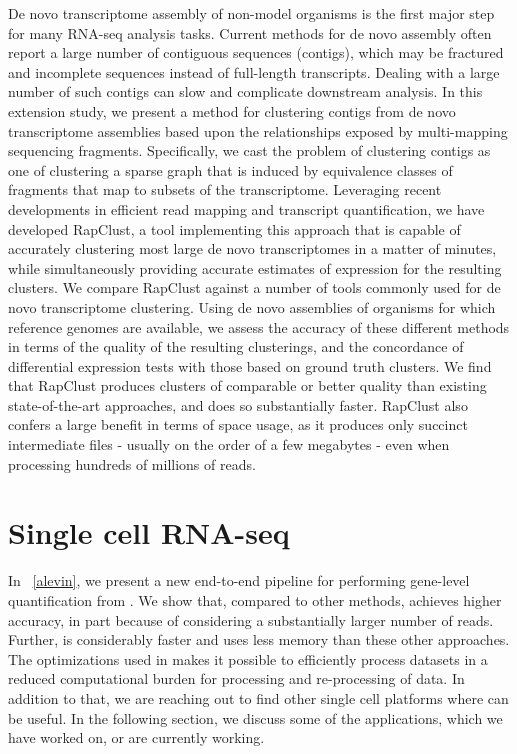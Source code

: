 De novo transcriptome assembly of non-model organisms is the first major step for many 
RNA-seq analysis tasks. Current methods for de novo assembly often report a large number 
of contiguous sequences (contigs), which may be fractured and incomplete sequences 
instead of full-length transcripts. Dealing with a large number of such contigs can 
slow and complicate downstream analysis. In this extension study, we present a method 
for clustering contigs from de novo transcriptome assemblies based upon the relationships 
exposed by multi-mapping sequencing fragments. Specifically, we cast the problem of 
clustering contigs as one of clustering a sparse graph that is induced by equivalence 
classes of fragments that map to subsets of the transcriptome. Leveraging recent developments 
in efficient read mapping and transcript quantification, we have developed RapClust, a tool 
implementing this approach that is capable of accurately clustering most large de novo 
transcriptomes in a matter of minutes, while simultaneously providing accurate estimates of 
expression for the resulting clusters. We compare RapClust against a number of tools commonly 
used for de novo transcriptome clustering. Using de novo assemblies of organisms for which 
reference genomes are available, we assess the accuracy of these different methods in terms of 
the quality of the resulting clusterings, and the concordance of differential expression tests 
with those based on ground truth clusters. We find that RapClust produces clusters of comparable 
or better quality than existing state-of-the-art approaches, and does so substantially faster. 
RapClust also confers a large benefit in terms of space usage, as it produces only succinct 
intermediate files - usually on the order of a few megabytes - even when processing hundreds 
of millions of reads.

\section{Single cell RNA-seq}
In ~\cref{alevin}, we present a new end-to-end pipeline for performing gene-level 
quantification from \dscrnaseq. We show that, compared to other methods, \alevin achieves
 higher accuracy, in part because of considering a substantially larger number
of reads. Further, \alevin is considerably faster and uses less memory than
these other approaches. The optimizations used in \alevin makes it possible to 
efficiently process \dscrnaseq datasets in a reduced computational burden for 
processing and re-processing of \dscrnaseq data. In addition to that, we are reaching out to 
find other single cell platforms where \alevin can be useful. 
In the following section, we discuss some of the applications, which we have worked on, 
or are currently working.

